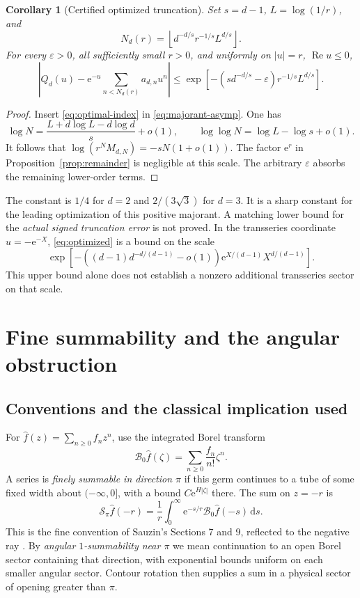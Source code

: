 \documentclass[11pt,a4paper]{article}
\numberwithin{equation}{section}
\newtheorem{corollary}[theorem]{Corollary}
\theoremstyle{definition}\newtheorem{definition}[theorem]{Definition}
\theoremstyle{remark}\newtheorem{remark}[theorem]{Remark}
\theoremstyle{definition}
\newcommand{\Rea}{\operatorname{Re}}\newcommand{\Ima}{\operatorname{Im}}
\newcommand{\dd}{\,\mathrm d}\newcommand{\e}{\mathrm e}
\newcommand{\B}{\mathcal B_0}\newcommand{\Hh}{\mathcal H}
\begin{document}
\begin{corollary}[Certified optimized truncation]
\label{cor:optimal}
Set $s=d-1$, $L=\log(1/r)$, and
\begin{equation}
 N_d(r)=\left\lfloor d^{-d/s}r^{-1/s}L^{d/s}\right\rfloor.
 \label{eq:optimal-index}
\end{equation}
For every $\varepsilon>0$, all sufficiently small $r>0$, and uniformly on
$|u|=r$, $\Rea u\le0$,
\begin{equation}
 \left|Q_d(u)-\e^{-u}\sum_{n<N_d(r)}a_{d,n}u^n\right|
 \le\exp\!\left[-\left(s d^{-d/s}-\varepsilon\right)
                     r^{-1/s}L^{d/s}\right].
 \label{eq:optimized}
\end{equation}
\end{corollary}
\begin{proof}
Insert \eqref{eq:optimal-index} in \eqref{eq:majorant-asymp}. One has
\[
 \log N=\frac{L+d\log L-d\log d}{s}+o(1),\qquad
 \log\log N=\log L-\log s+o(1).
\]
It follows that $\log(r^N M_{d,N})=-sN(1+o(1))$.
The factor $\e^r$ in Proposition~\ref{prop:remainder} is negligible at this
scale. The arbitrary $\varepsilon$ absorbs the remaining lower-order terms.
\end{proof}
The constant is $1/4$ for $d=2$ and $2/(3\sqrt3)$ for $d=3$.
It is a sharp constant for the leading optimization of this positive
majorant. A matching lower bound for the \emph{actual signed truncation error}
is not proved. In the transseries coordinate $u=-\e^{-X}$,
\eqref{eq:optimized} is a bound on the scale
\[
 \exp\!\left[-\left((d-1)d^{-d/(d-1)}-o(1)\right)
       \e^{X/(d-1)}X^{d/(d-1)}\right].
\]
This upper bound alone does not establish a nonzero additional transseries
sector on that scale.

\section{Fine summability and the angular obstruction}
\label{sec:summability}
\subsection{Conventions and the classical implication used}
For $\widehat f(z)=\sum_{n\ge0}f_nz^n$, use the integrated Borel transform
\begin{equation}
 \B\widehat f(\zeta)=\sum_{n\ge0}\frac{f_n}{n!}\zeta^n.
 \label{eq:Borel}
\end{equation}
A series is \emph{finely summable in direction $\pi$} if this germ continues
to a tube of some fixed width about $(-\infty,0]$, with a bound
$C\e^{H|\zeta|}$ there. The sum on $z=-r$ is
\begin{equation}
 \mathcal S_\pi\widehat f(-r)=\frac1r\int_0^\infty
          \e^{-s/r}\B\widehat f(-s)\dd s.
 \label{eq:sum}
\end{equation}
This is the fine convention of Sauzin's Sections 7 and 9, reflected to the
negative ray \cite{sauzin}. By \emph{angular $1$-summability near $\pi$} we
mean continuation to an open Borel sector containing that direction, with
exponential bounds uniform on each smaller angular sector. Contour rotation
then supplies a sum in a physical sector of opening greater than $\pi$.
\end{document}

